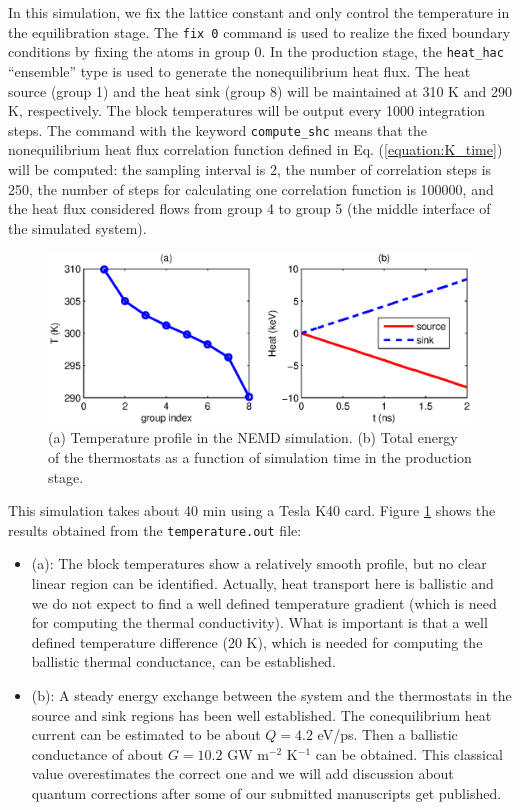 \documentclass[12pt,a4paper]{report}
\begin{document}
In this simulation, we fix the lattice constant and only control the temperature in the equilibration stage. The \verb"fix 0" command is used to realize the fixed boundary conditions by fixing the atoms in group 0. In the production stage, the \verb"heat_hac" ``ensemble'' type is used to generate the nonequilibrium heat flux.  The heat source (group 1) and the heat sink (group 8) will be maintained at 310 K and 290 K, respectively. The block temperatures will be output every 1000 integration steps. The command with the keyword \verb"compute_shc" means that the nonequilibrium heat flux correlation function defined in Eq. (\ref{equation:K_time}) will be computed: the sampling interval is 2, the number of correlation steps is 250, the number of steps for calculating one correlation function is 100000, and the heat flux considered flows from group 4 to group 5 (the middle interface of the simulated system).


\begin{figure}[ht]
\begin{center}
\includegraphics[width=\columnwidth]{ex4a.eps}
\caption{(a) Temperature profile in the NEMD simulation. (b) Total energy of the thermostats as a function of simulation time in the production stage. }
\label{figure:ex4a}
\end{center}
\end{figure}

This simulation takes about 40 min using a Tesla K40 card. Figure \ref{figure:ex4a} shows the results obtained from the \verb"temperature.out" file:
\begin{itemize}
\item (a): The block temperatures show a relatively smooth profile, but no clear linear region can be identified. Actually, heat transport here is ballistic and we do not expect to find a well defined temperature gradient (which is need for computing the thermal conductivity). What is important is that a well defined temperature difference (20 K), which is needed for computing the ballistic thermal conductance, can be established.
\item (b): A steady energy exchange between the system and the thermostats in the source and sink regions has been well established. The conequilibrium heat current can be estimated to be about $Q=4.2$ eV/ps. Then a ballistic conductance of about $G=10.2$ GW m$^{-2}$ K$^{-1}$ can be obtained. This classical value overestimates the correct one and we will add discussion about quantum corrections after some of our submitted manuscripts get published.
\end{itemize}
\end{document}
